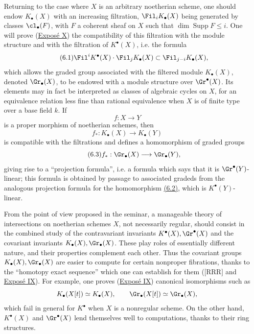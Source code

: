 Returning to the case where $X$ is an arbitrary noetherian scheme, one should endow $K_\bullet(X)$ with an increasing filtration, $\Fil_iK_\bullet(X)$ being generated by classes $\cl_\bullet(F)$, with $F$ a coherent sheaf on $X$ such that $\dim \operatorname{Supp}F\le i$. One will prove (\hyperlink{sga6.e10.expose}{Expos\'e X}) the compatibility of this filtration with the module structure and with the filtration of $K^\bullet(X)$, i.e. the formula
\begin{equation}\tag{6.1}
\Fil^iK^\bullet(X)\cdot \Fil_jK_\bullet(X)\subset \Fil_{j-i}K_\bullet(X),
\end{equation}
which allows the graded group associated with the filtered module $K_\bullet(X)$, denoted $\Gr_\bullet(X)$, to be endowed with a module structure over $\Gr^\bullet(X)$. Its elements may in fact be interpreted as classes of algebraic cycles on $X$, for an equivalence relation less fine than rational equivalence when $X$ is of finite type over a base field $k$. If
\[
f:X\longrightarrow Y
\]
is a proper morphism of noetherian schemes, then
\begin{equation}\tag{6.2}
f_*:K_\bullet(X)\longrightarrow K_\bullet(Y)
\end{equation}
is compatible with the filtrations and defines a homomorphism of graded groups
\begin{equation}\tag{6.3}
f_*:\Gr_\bullet(X)\longrightarrow \Gr_\bullet(Y),
\end{equation}
giving rise to a ``projection formula'', i.e. a formula which says that it is $\Gr^\bullet(Y)$-linear; this formula is obtained by passage to associated gradeds from the analogous projection formula for the homomorphism \hyperlink{sga6.e00.eq.6-2}{(6.2)}, which is $K^\bullet(Y)$-linear.

From the point of view proposed in the seminar, a manageable theory of intersections on noetherian schemes $X$, not necessarily regular, should consist in the combined study of the contravariant invariants $K^\bullet(X),\Gr^\bullet(X)$ and the covariant invariants $K_\bullet(X),\Gr_\bullet(X)$. These play roles of essentially different nature, and their properties complement each other. Thus the covariant groups $K_\bullet(X),\Gr_\bullet(X)$ are easier to compute for certain nonproper fibrations, thanks to the ``homotopy exact sequence'' which one can establish for them ([RRR] and \hyperlink{sga6.e09.expose}{Expos\'e IX}). For example, one proves (\hyperlink{sga6.e09.expose}{Expos\'e IX}) canonical isomorphisms such as
\[
K_\bullet(X[t])\simeq K_\bullet(X),\qquad \Gr_\bullet(X[t])\simeq \Gr_\bullet(X),
\]
which fail in general for $K^\bullet$ when $X$ is a nonregular scheme. On the other hand, $K^\bullet(X)$ and $\Gr^\bullet(X)$ lend themselves well to computations, thanks to their ring structures.

